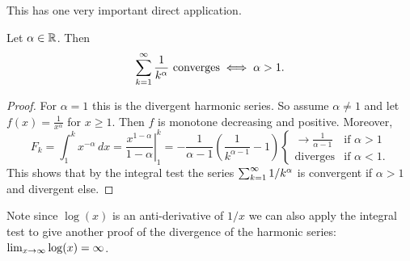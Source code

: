 \documentclass[10pt, a4paper]{article}
\begin{document}
This has one very important direct application.

\begin{corollary}
    Let $\alpha \in \R$.
    Then
    \[
    \infsum\frac{1}{k ^ {\alpha}}\text{ converges} \iff \alpha > 1.
    \]
    
    \begin{proof}
        For $\alpha = 1$ this is the divergent harmonic series.
        So assume $\alpha \neq 1$ and let $f(x) = \frac{1}{x ^ {\alpha}}$ for $x \geq 1$.
        Then $f$ is monotone decreasing and positive.
        Moreover,
        \[
        F_k = \int_{1}^{k}x ^ {-\alpha}\,dx = \left.\frac{x ^ {1 - \alpha}}{1 - \alpha}\right|_{1}^{k} = -\frac{1}{\alpha - 1}\left(\frac{1}{k ^ {\alpha - 1}} - 1\right)\begin{cases}
            \rightarrow\frac{1}{\alpha - 1} &\text{if } \alpha > 1 \\
            \text{diverges} &\text{if } \alpha < 1.
        \end{cases}
        \]
        This shows that by the integral test the series $\infsum 1 / k ^ {\alpha}$ is convergent if $\alpha > 1$ and divergent else.
    \end{proof}
\end{corollary}

\begin{remark}
    Note since $\log(x)$ is an anti-derivative of $1 / x$ we can also apply the integral test to give another proof of the divergence of the harmonic series: $\liminfty[x]\log(x) = \infty$.
\end{remark}
\end{document}
